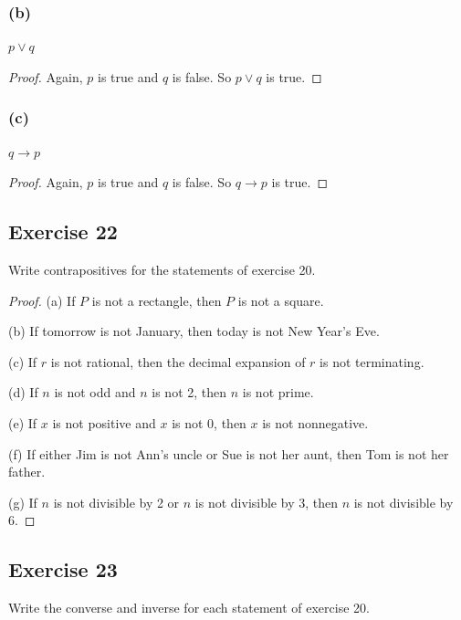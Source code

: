 \documentclass[14pt]{extarticle}
\begin{document}
\subsubsection{(b)}
$p \vee q$
\begin{proof}
Again, $p$ is true and $q$ is false. So $p \vee q$ is true.
\end{proof}

\subsubsection{(c)}
$q \to p$

\begin{proof}
Again, $p$ is true and $q$ is false. So $q \to p$ is true.
\end{proof}

\subsection{Exercise 22}
Write contrapositives for the statements of exercise 20.

\begin{proof}
(a) If $P$ is not a rectangle, then $P$ is not a square.

(b) If tomorrow is not January, then today is not New Year’s Eve.

(c) If $r$ is not rational, then the decimal expansion of $r$ is not terminating.

(d) If $n$ is not odd and $n$ is not 2, then $n$ is not prime.

(e) If $x$ is not positive and $x$ is not 0, then $x$ is not nonnegative.

(f) If either Jim is not Ann’s uncle or Sue is not her aunt, then Tom is not her father.

(g) If $n$ is not divisible by 2 or $n$ is not divisible by 3, then $n$ is not divisible by 6.
\end{proof}

\subsection{Exercise 23}
Write the converse and inverse for each statement of exercise 20.
\end{document}
